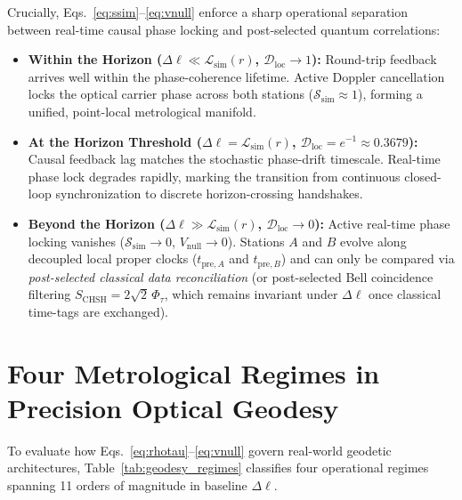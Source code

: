 \documentclass[11pt,a4paper]{article}
\begin{document}
Crucially, Eqs.~\eqref{eq:ssim}--\eqref{eq:vnull} enforce a sharp operational separation between real-time causal phase locking and post-selected quantum correlations:
\begin{itemize}[leftmargin=1.6em]
    \item \textbf{Within the Horizon ($\Delta\ell \ll \mathcal{L}_{\mathrm{sim}}(r)$, $\mathcal{D}_{\mathrm{loc}} \to 1$):} Round-trip feedback arrives well within the phase-coherence lifetime. Active Doppler cancellation locks the optical carrier phase across both stations ($\mathcal{S}_{\mathrm{sim}} \approx 1$), forming a unified, point-local metrological manifold.
    \item \textbf{At the Horizon Threshold ($\Delta\ell = \mathcal{L}_{\mathrm{sim}}(r)$, $\mathcal{D}_{\mathrm{loc}} = e^{-1} \approx 0.3679$):} Causal feedback lag matches the stochastic phase-drift timescale. Real-time phase lock degrades rapidly, marking the transition from continuous closed-loop synchronization to discrete horizon-crossing handshakes.
    \item \textbf{Beyond the Horizon ($\Delta\ell \gg \mathcal{L}_{\mathrm{sim}}(r)$, $\mathcal{D}_{\mathrm{loc}} \to 0$):} Active real-time phase locking vanishes ($\mathcal{S}_{\mathrm{sim}} \to 0$, $V_{\mathrm{null}} \to 0$). Stations $A$ and $B$ evolve along decoupled local proper clocks ($t_{\mathrm{pre},A}$ and $t_{\mathrm{pre},B}$) and can only be compared via \emph{post-selected classical data reconciliation} (or post-selected Bell coincidence filtering $S_{\mathrm{CHSH}} = 2\sqrt{2}\,\Phi_\tau$, which remains invariant under $\Delta\ell$ once classical time-tags are exchanged).
\end{itemize}

\section{Four Metrological Regimes in Precision Optical Geodesy}

To evaluate how Eqs.~\eqref{eq:rhotau}--\eqref{eq:vnull} govern real-world geodetic architectures, Table~\ref{tab:geodesy_regimes} classifies four operational regimes spanning 11 orders of magnitude in baseline $\Delta\ell$.
\end{document}
